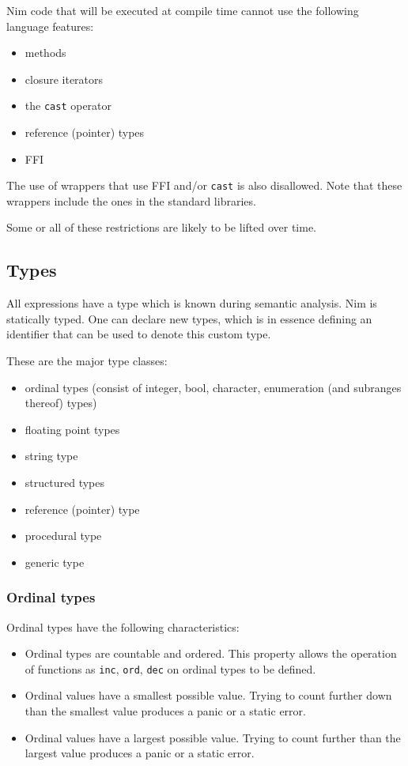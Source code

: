 Nim code that will be executed at compile time cannot use the following
language features:

\begin{itemize}
\tightlist
\item
  methods
\item
  closure iterators
\item
  the \texttt{cast} operator
\item
  reference (pointer) types
\item
  FFI
\end{itemize}

The use of wrappers that use FFI and/or \texttt{cast} is also
disallowed. Note that these wrappers include the ones in the standard
libraries.

Some or all of these restrictions are likely to be lifted over time.

\hypertarget{types}{%
\subsection{Types}\label{types}}

All expressions have a type which is known during semantic analysis. Nim
is statically typed. One can declare new types, which is in essence
defining an identifier that can be used to denote this custom type.

These are the major type classes:

\begin{itemize}
\tightlist
\item
  ordinal types (consist of integer, bool, character, enumeration (and
  subranges thereof) types)
\item
  floating point types
\item
  string type
\item
  structured types
\item
  reference (pointer) type
\item
  procedural type
\item
  generic type
\end{itemize}

\hypertarget{ordinal-types}{%
\subsubsection{Ordinal types}\label{ordinal-types}}

Ordinal types have the following characteristics:

\begin{itemize}
\tightlist
\item
  Ordinal types are countable and ordered. This property allows the
  operation of functions as \texttt{inc}, \texttt{ord}, \texttt{dec} on
  ordinal types to be defined.
\item
  Ordinal values have a smallest possible value. Trying to count further
  down than the smallest value produces a panic or a static error.
\item
  Ordinal values have a largest possible value. Trying to count further
  than the largest value produces a panic or a static error.
\end{itemize}

